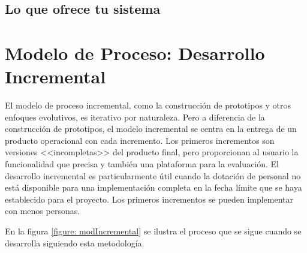 		
		
	\subsection{Lo que ofrece tu sistema}
	
	
\blindtext[3]

\section{Modelo de Proceso: Desarrollo Incremental}
El modelo de proceso incremental, como la construcción de prototipos y otros enfoques evolutivos, es iterativo por naturaleza. Pero a diferencia de la construcción de prototipos, el modelo incremental se centra en la entrega de un producto operacional con cada incremento. Los primeros incrementos son versiones <<incompletas>> del producto final, pero proporcionan al usuario la funcionalidad que precisa y también una plataforma para la evaluación. El desarrollo incremental es particularmente útil cuando la dotación de personal no está disponible para una implementación completa en la fecha límite que se haya establecido para el proyecto. Los primeros incrementos se pueden implementar con menos personas. \cite{pressman2002ingenieria}

En la figura \ref{figure: modIncremental} se ilustra el proceso que se sigue cuando se desarrolla siguiendo esta metodología. 

